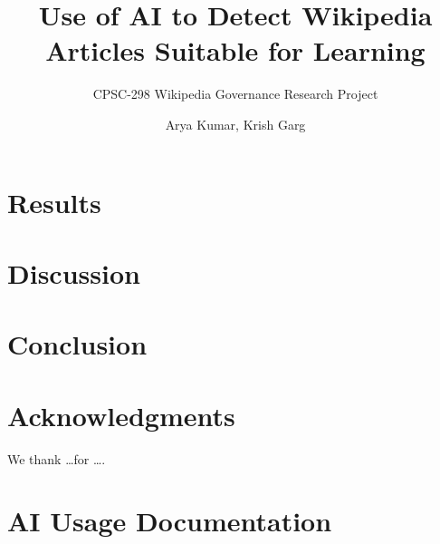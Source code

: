 \documentclass[sigconf,screen]{acmart}
\title{Use of AI to Detect Wikipedia Articles Suitable for Learning}
\subtitle{CPSC-298 Wikipedia Governance Research Project}
\author{Arya Kumar, Krish Garg}
\affiliation{%
  \institution{Chapman University}
  \city{Orange}
  \country{USA}
}
\begin{document}
    
  
    

\maketitle







\section{Results}


\section{Discussion}


\section{Conclusion}


\section*{Acknowledgments}
We thank \dots for \ldots.




\appendix
\section{AI Usage Documentation}

\end{document}

